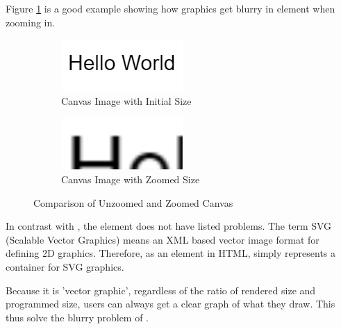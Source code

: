 \documentclass[12pt,twoside]{report}
\begin{document}
Figure \ref{fig:canvas-zoom-comparison} is a good example showing how graphics get blurry in  element when zooming in.

\begin{figure}[h!]
    \centering
    \begin{subfigure}[b]{0.4\linewidth}
        \centering
        \includegraphics[width=\linewidth, frame]{figures/unzoomed-canvas.png}
        \caption{Canvas Image with Initial Size}
    \end{subfigure}
    \begin{subfigure}[b]{0.4\linewidth}
        \centering
        \includegraphics[width=\linewidth, frame]{figures/zoomed-canvas.png}
        \caption{Canvas Image with Zoomed Size}
    \end{subfigure}
    \caption{Comparison of Unzoomed and Zoomed Canvas}
    \label{fig:canvas-zoom-comparison}
\end{figure}

In contrast with , the  element does not have listed
problems. The term SVG (Scalable Vector Graphics) means an XML based vector
image format for defining 2D graphics. Therefore, as an element in HTML,
 simply represents a container for SVG graphics.

Because it is 'vector graphic', regardless of the ratio of rendered size and
programmed size, users can always get a clear graph of what they draw. This thus
solve the blurry problem of .
\end{document}
